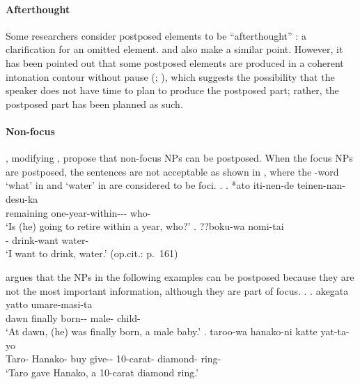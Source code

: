 \paragraph{Afterthought}

Some researchers consider postposed elements to be ``afterthought'' \cite[259]{shibatani90}:
a clarification for an omitted element.
 and  also make a similar point.
However,
it has been pointed out that
some postposed elements are produced in a coherent intonation contour without pause (; ),
which suggests the possibility that
the speaker does not have time to plan to produce the postposed part;
rather, the postposed part has been planned as such.




\paragraph{Non-focus}

,
modifying ,
propose that non-focus NPs can be postposed.
When the focus NPs are postposed,
the sentences are not acceptable
as shown in \Next,
where the -word  `what' in \Next[a] and
 `water' in \Next[b] are considered to be foci.
%
\ex.
 \ag. *ato iti-nen-de teinen-nan-desu-ka  \\
      remaining one-year-within--- who- \\
      `Is (he) going to retire within a year, who?'
      \hfill{\cite[160]{takami95b}}      
 \bg. ??boku-wa nomi-tai  \\
      - drink-want water- \\
      `I want to drink, water.'
      \hfill{(op.cit.: p.~161)}

 argues that
the NPs in the following examples can be postposed because
they are not the most important information,
although they are part of focus.
%
\ex.
 \ag. akegata yatto umare-masi-ta   \\
      dawn finally born-- male- child- \\
      `At dawn, (he) was finally born, a male baby.'
 \bg. taroo-wa hanako-ni katte yat-ta-yo    \\
      Taro- Hanako- buy give-- 10-carat- diamond- ring- \\
      `Taro gave Hanako, a 10-carat diamond ring.'
      \hfill{\cite[236]{takami95a}}

